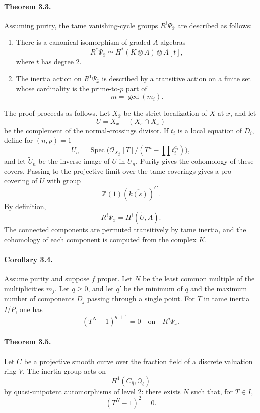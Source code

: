 \documentclass[12pt]{article}
\newcommand{\ZZ}{\mathbb Z}
\newcommand{\QQ}{\mathbb Q}
\newcommand{\cO}{\mathcal O}
\newcommand{\Spec}{\operatorname{Spec}}
\begin{document}
\paragraph{Theorem 3.3.}
Assuming purity, the tame vanishing-cycle groups $R^i\Psi_{\bar x}$ are described as follows:
\begin{enumerate}[label=\roman*)]
\item There is a canonical isomorphism of graded $A$-algebras
\[
R^*\Psi_{\bar x}\simeq H^*(K\otimes A)\otimes A[t],
\]
where $t$ has degree $2$.
\item The inertia action on $R^1\Psi_{\bar x}$ is described by a transitive action on a finite set whose cardinality is the prime-to-$p$ part of
\[
m=\gcd(m_i).
\]
\end{enumerate}

The proof proceeds as follows. Let $X_{\bar x}$ be the strict localization of $X$ at $\bar x$, and let
\[
U=X_{\bar x}-(X_s\cap X_{\bar x})
\]
be the complement of the normal-crossings divisor. If $t_i$ is a local equation of $D_i$, define for $(n,p)=1$
\[
U_n=\Spec\bigl(\cO_{X_{\bar x}}[T]/(T^n-\prod t_i^{a_i})\bigr),
\]
and let $\widetilde U_n$ be the inverse image of $U$ in $U_n$. Purity gives the cohomology of these covers. Passing to the projective limit over the tame coverings gives a pro-covering of $U$ with group
\[
\ZZ(1)(\overline{k(s)})^C.
\]
By definition,
\[
R^i\Psi_{\bar x}=H^i(\widetilde U,A).
\]
The connected components are permuted transitively by tame inertia, and the cohomology of each component is computed from the complex $K$.

\paragraph{Corollary 3.4.}
Assume purity and suppose $f$ proper. Let $N$ be the least common multiple of the multiplicities $m_j$. Let $q\geq0$, and let $q'$ be the minimum of $q$ and the maximum number of components $D_j$ passing through a single point. For $T$ in tame inertia $I/P$, one has
\[
(T^N-1)^{q'+1}=0
\quad\text{on}\quad
R^q\Psi_{\bar x}.
\]

\paragraph{Theorem 3.5.}
Let $C$ be a projective smooth curve over the fraction field of a discrete valuation ring $V$. The inertia group acts on
\[
H^1(C_{\bar\eta},\QQ_\ell)
\]
by quasi-unipotent automorphisms of level $2$: there exists $N$ such that, for $T\in I$,
\[
(T^N-1)^2=0.
\]
\end{document}
